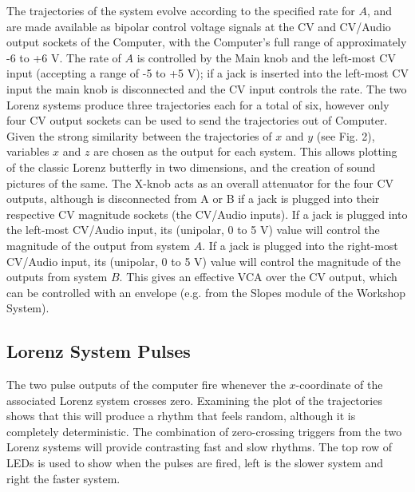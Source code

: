 \documentclass{tufte-handout}
\begin{document}
The trajectories of the system evolve according to the specified rate for $A$, and are made available as bipolar control voltage signals at the CV and CV/Audio output sockets of the Computer, with the Computer's full range of approximately -6 to +6 V. The rate of $A$ is controlled by the Main knob and the left-most CV input (accepting a range of -5 to +5 V); if a jack is inserted into the left-most CV input the main knob is disconnected and the CV input controls the rate. The two Lorenz systems produce three trajectories each for a total of six, however only four CV output sockets can be used to send the trajectories out of Computer. Given the strong similarity between the trajectories of $x$ and $y$ (see Fig. 2), variables $x$ and $z$ are chosen as the output for each system. This allows plotting of the classic Lorenz butterfly in two dimensions, and the creation of sound pictures of the same. The X-knob acts as an overall attenuator for the four CV outputs, although is disconnected from A or B if a jack is plugged into their respective CV magnitude sockets (the CV/Audio inputs). If a jack is plugged into the left-most CV/Audio input, its (unipolar, 0 to 5 V) value will control the magnitude of the output from system $A$. If a jack is plugged into the right-most CV/Audio input, its (unipolar, 0 to 5 V) value will control the magnitude of the outputs from system $B$. This gives an effective VCA over the CV output, which can be controlled with an envelope (e.g. from the Slopes module of the Workshop System). 


\subsection{Lorenz System Pulses}

The two pulse outputs of the computer fire whenever the $x$-coordinate of the associated Lorenz system crosses zero. Examining the plot of the trajectories shows that this will produce a rhythm that feels random, although it is completely deterministic. The combination of zero-crossing triggers from the two Lorenz systems will provide contrasting fast and slow rhythms. The top row of LEDs is used to show when the pulses are fired, left is the slower system and right the faster system.
\end{document}

